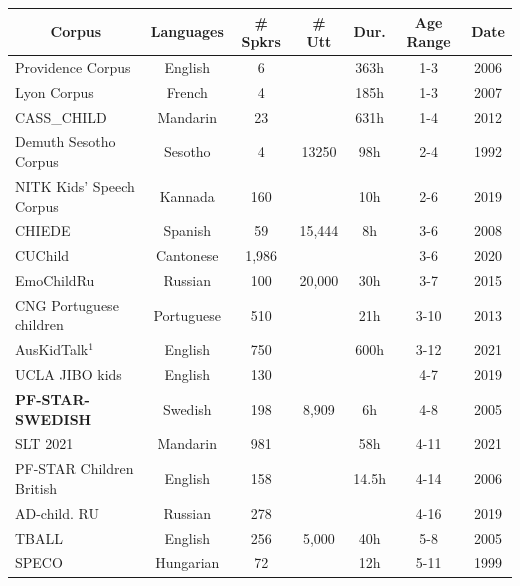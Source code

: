 \begin{table}
\small
\begin{tabular}{l|c|c|c|c|c|c} 
\hline
\multicolumn{1}{c|}{\textbf{Corpus}} & \multicolumn{1}{c|}{\textbf{Languages}} & \multicolumn{1}{c|}{\textbf{\# Spkrs}} & \multicolumn{1}{c|}{\textbf{\# Utt}} & \multicolumn{1}{c|}{\textbf{Dur.}} & \multicolumn{1}{c|}{\textbf{Age Range}} & \multicolumn{1}{c}{\textbf{Date}} \\ 
\hline
Providence Corpus \cite{providence} & English & 6 &  & 363h & 1-3 & 2006 \\ 
\hline
Lyon Corpus \cite{LyonSC} & French & 4 &  & 185h & 1-3 & 2007 \\ 
\hline
CASS\_CHILD \cite{cass_child} & Mandarin & 23 &  & 631h & 1-4 & 2012 \\ 
\hline
Demuth Sesotho Corpus \cite{demuth1992acquisition} & Sesotho & 4 & 13250 & 98h & 2-4 & 1992 \\ 
\hline
NITK Kids’ Speech Corpus \cite{nitk} & Kannada & 160 &  & 10h & 2-6 & 2019 \\ 
\hline
CHIEDE \cite{chiede} & Spanish & 59 & 15,444 & 8h & 3-6 & 2008 \\ 
\hline
CUChild \cite{cuchild} & Cantonese & 1,986 &  &  & 3-6 & 2020 \\ 
\hline
EmoChildRu \cite{emochildru} & Russian & 100 & 20,000 & 30h & 3-7 & 2015 \\ 
\hline
CNG Portuguese children\cite{hamalainen2013cng} & Portuguese & 510 &  & 21h & 3-10 & 2013 \\ 
\hline
AusKidTalk$^1$ \cite{ahmed2021auskidtalk} & English & 750 &  & 600h & 3-12 & 2021 \\ 
\hline
UCLA JIBO kids \cite{yeung2019robotic} & English & 130 &  &  & 4-7 & 2019 \\ 
\hline
\textbf{PF-STAR-SWEDISH} \cite{pfstar}
& Swedish & 198 & 8,909 & 6h & 4-8 & 2005 \\ 
\hline
SLT 2021 \cite{yu2021slt} & Mandarin & 981 &  & 58h & 4-11 & 2021 \\ 
\hline
PF-STAR Children British \cite{pfstar,russell2006pf,pf-star-british} & English & 158 &  & 14.5h & 4-14 & 2006 \\ 
\hline
AD-child. RU \cite{ad-child_ru} & Russian & 278 &  &  & 4-16 & 2019 \\ 
\hline
TBALL \cite{tball} & English & 256 & 5,000 & 40h & 5-8 & 2005 \\ 
\hline
SPECO \cite{speco} & Hungarian & 72 &  & 12h & 5-11 & 1999 \\ 
\hline

\end{tabular}
\end{table}

